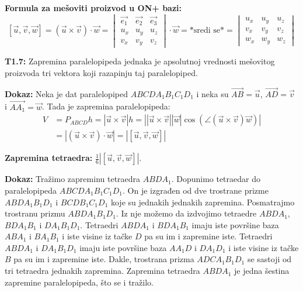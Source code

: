 \documentclass[12pt]{article}
\newcommand{\vek}[1]{\overrightarrow{#1}}
\begin{document}
\textbf{Formula za mešoviti proizvod u ON+ bazi:}
$$[\vek{u},\vek{v},\vek{w}]=(\vek{u}\times\vek{v})\cdot\vek{w}= \begin{vmatrix}
        \vek{e_1} & \vek{e_2} & \vek{e_3} \\
        u_x       & u_y       & u_z       \\
        v_x       & v_y       & v_z
    \end{vmatrix}\cdot\vek{w}=\text{*sredi se*}= \begin{vmatrix}
        u_x & u_y & u_z \\
        v_x & v_y & v_z \\
        w_x & w_y & w_z
    \end{vmatrix}$$
\par

\textbf{T1.7:} Zapremina paralelopipeda jednaka je apsolutnoj vrednosti
mešovitog proizvoda tri vektora koji razapinju taj paralelopiped.
\par
\textbf{Dokaz:} Neka je dat paralelopiped $ABCDA_1B_1C_1D_1$ i neka su
$\vek{AB}=\vek{u}$, $\vek{AD}=\vek{v}$ i $\vek{AA_1}=\vek{w}$. Tada je
zapremina paralelopipeda:
\begin{align*}
    V & =P_{ABCD}h=|\vek{u}\times\vek{v}|h=\left|\left|\vek{u}\times\vek{v}\right|
    \left|\vek{w}\right|\cos(\angle{(\vek{u}\times\vek{v})\vek{w}})\right|         \\
      & =|(\vek{u}\times\vek{v}) \cdot \vek{w}|=
    |[\vek{u},\vek{v},\vek{w}]|
\end{align*}
\par

\textbf{Zapremina tetraedra:} $\frac{1}{6}|[\vek{u},\vek{v},\vek{w}]|$.
\par
\textbf{Dokaz:} Tražimo zapreminu tetraedra $ABDA_1$. Dopunimo tetraedar do
paralelopipeda $ABCDA_1B_1C_1D_1$. On je izgrađen od dve trostrane prizme
$ABDA_1B_1D_1$ i $BCDB_1C_1D_1$ koje su jednakih jednakih zapremina.
Posmatrajmo trostranu prizmu $ABDA_1B_1D_1$. Iz nje možemo da izdvojimo
tetraedre $ABDA_1$, $BDA_1B_1$ i $DA_1B_1D_1$. Tetraedri $ABDA_1$ i $BDA_1B_1$
imaju iste površine baza $ABA_1$ i $BA_1B_1$ i iste visine iz tačke $D$ pa su
im i zapremine iste. Tetraedri $ABDA_1$ i $DA_1B_1D_1$ imaju iste površine baza
$AA_1D$ i $DA_1D_1$ i iste visine iz tačke $B$ pa su im i zapremine iste.
Dakle, trostrana prizma $ADCA_1B_1D_1$ se sastoji od tri tetraedra jednakih
zapremina. Zapremina tetraedra $ABDA_1$ je jedna šestina zapremine
paralelopipeda, što se i tražilo.
\par
\end{document}
